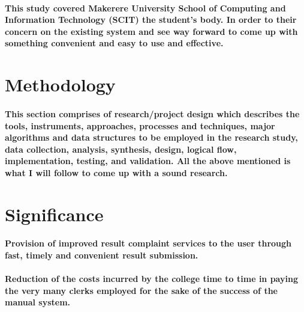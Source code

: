 \documentclass[10pt]{article}
\begin{document}
\paragraph{This study covered Makerere University School of Computing and Information Technology (SCIT) the student’s body. In order to their concern on the existing system and see way forward to come up with something convenient and easy to use and effective.}
\section{Methodology }
\paragraph{This section comprises of research/project design which describes the tools, instruments, approaches, processes and techniques, major algorithms and data structures to be employed in the research study, data collection, analysis, synthesis, design, logical flow, implementation, testing, and validation. All the above mentioned is what I will follow to come up with a sound research.}
\section{Significance}
\paragraph{Provision of improved result complaint services to the user through fast, timely and convenient result submission.}
\paragraph{Reduction of the costs incurred by the college time to time in paying the very many clerks employed for the sake of the success of the manual system.}
\end{document}

